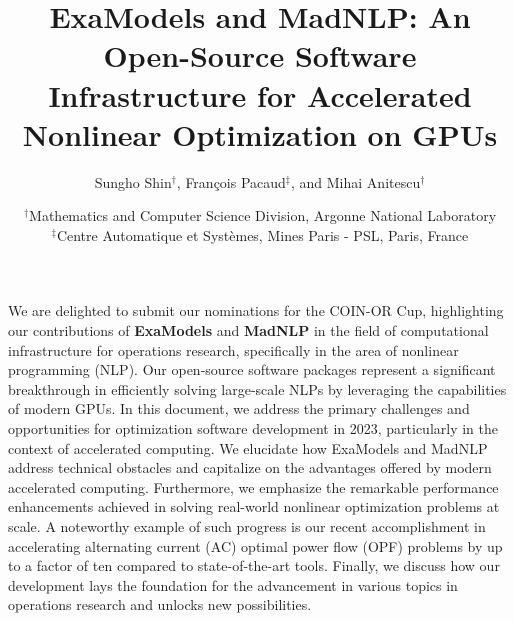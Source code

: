 
\usepackage{wrapfig}
\title{
  \vspace{-.35in}
  ExaModels and MadNLP: An Open-Source Software Infrastructure for Accelerated Nonlinear Optimization on GPUs
  \vspace{-.15in}
}
\author{
  Sungho Shin$^\dag$, François Pacaud$^\ddag$, and Mihai Anitescu$^\dag$
}
\date{\small
  \vspace{-.1in}
  $^\dag$Mathematics and Computer Science Division, Argonne National Laboratory\\
  $^\ddag$Centre Automatique et Systèmes, Mines Paris - PSL, Paris, France
  \vspace{-.1in}
}

\maketitle

We are delighted to submit our nominations for the COIN-OR Cup,
highlighting our contributions of {\bf ExaModels} \cite{examodels} and
{\bf MadNLP} \cite{madnlp} in the field of computational
infrastructure for operations research, specifically in the area of
nonlinear programming (NLP). Our open-source software packages
represent a significant breakthrough in efficiently solving
large-scale NLPs by leveraging the capabilities of modern GPUs.
In this document, we address the primary challenges and
opportunities for optimization software development in 2023,
particularly in the context of accelerated computing. We elucidate
how ExaModels and MadNLP address technical obstacles and
capitalize on the advantages offered by modern accelerated
computing. Furthermore, we emphasize the remarkable performance
enhancements achieved in solving real-world nonlinear optimization
problems at scale. A noteworthy example of such progress is our recent
accomplishment in accelerating alternating current (AC) optimal power
flow (OPF) problems by up to a factor of ten compared to state-of-the-art
tools. Finally, we discuss how our development lays the foundation for
the advancement in various topics in operations research and unlocks
new possibilities.

